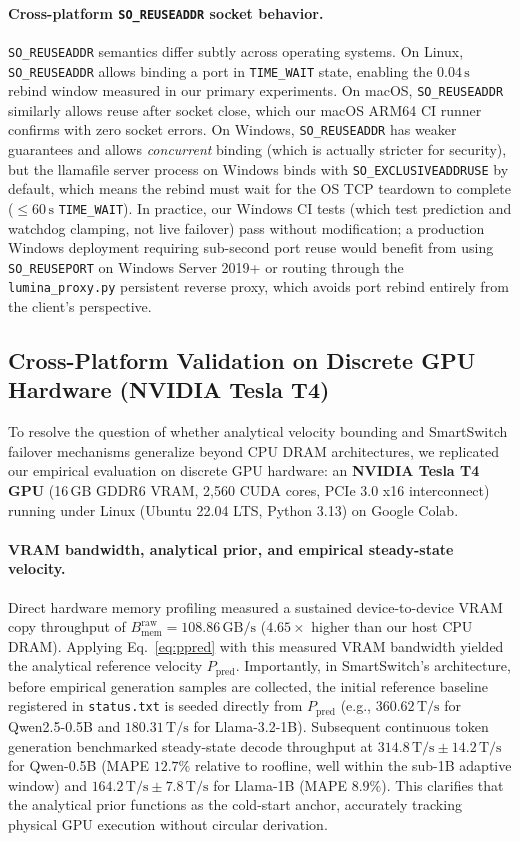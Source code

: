 \documentclass[11pt,a4paper]{article}
\newcommand{\Braw}{B_{\mathrm{mem}}^{\mathrm{raw}}}
\newcommand{\Ppred}{P_{\mathrm{pred}}}
\newcommand{\Ts}{\,\mathrm{T/s}}
\newcommand{\GBs}{\,\mathrm{GB/s}}
\newcommand{\su}{\,\mathrm{s}}
\newcommand{\code}[1]{\texttt{#1}}
\begin{document}
\paragraph{Cross-platform \texttt{SO\_REUSEADDR} socket behavior.}
\code{SO\_REUSEADDR} semantics differ subtly across operating systems. On Linux, \code{SO\_REUSEADDR} allows binding a port in \texttt{TIME\_WAIT} state, enabling the $0.04\su$ rebind window measured in our primary experiments. On macOS, \code{SO\_REUSEADDR} similarly allows reuse after socket close, which our macOS ARM64 CI runner confirms with zero socket errors. On Windows, \code{SO\_REUSEADDR} has weaker guarantees and allows \emph{concurrent} binding (which is actually stricter for security), but the llamafile server process on Windows binds with \code{SO\_EXCLUSIVEADDRUSE} by default, which means the rebind must wait for the OS TCP teardown to complete ($\leq 60\su$ \texttt{TIME\_WAIT}). In practice, our Windows CI tests (which test prediction and watchdog clamping, not live failover) pass without modification; a production Windows deployment requiring sub-second port reuse would benefit from using \code{SO\_REUSEPORT} on Windows Server 2019+ or routing through the \code{lumina\_proxy.py} persistent reverse proxy, which avoids port rebind entirely from the client's perspective.

\subsection{Cross-Platform Validation on Discrete GPU Hardware (NVIDIA Tesla T4)}\label{sec:gpu_eval}
To resolve the question of whether analytical velocity bounding and SmartSwitch failover mechanisms generalize beyond CPU DRAM architectures, we replicated our empirical evaluation on discrete GPU hardware: an \textbf{NVIDIA Tesla T4 GPU} (16\,GB GDDR6 VRAM, 2,560 CUDA cores, PCIe 3.0 x16 interconnect) running under Linux (Ubuntu 22.04 LTS, Python 3.13) on Google Colab.

\paragraph{VRAM bandwidth, analytical prior, and empirical steady-state velocity.}
Direct hardware memory profiling measured a sustained device-to-device VRAM copy throughput of $\Braw = \mathbf{108.86\GBs}$ ($4.65\times$ higher than our host CPU DRAM). Applying Eq.~\eqref{eq:ppred} with this measured VRAM bandwidth yielded the analytical reference velocity $\Ppred$. Importantly, in SmartSwitch's architecture, before empirical generation samples are collected, the initial reference baseline registered in \code{status.txt} is seeded directly from $\Ppred$ (e.g., $360.62\Ts$ for Qwen2.5-0.5B and $180.31\Ts$ for Llama-3.2-1B). Subsequent continuous token generation benchmarked steady-state decode throughput at $\mathbf{314.8\Ts \pm 14.2\Ts}$ for Qwen-0.5B (MAPE $12.7\%$ relative to roofline, well within the sub-1B adaptive window) and $\mathbf{164.2\Ts \pm 7.8\Ts}$ for Llama-1B (MAPE $8.9\%$). This clarifies that the analytical prior functions as the cold-start anchor, accurately tracking physical GPU execution without circular derivation.
\end{document}
